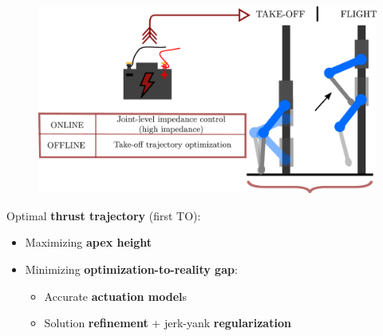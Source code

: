 \documentclass[aspectratio=169]{beamer}
\begin{document}

%


\begin{frame}
\frametitle{\Large}
\begin{multicols}{2}
\vfill\null
\begin{figure}
    \centering
    \includegraphics[width=1.0\columnwidth]{beamer_imgs/impact_opt_intro/first_TO.pdf}
\end{figure}
\columnbreak
Optimal \textbf{thrust trajectory} (first TO):
\begin{itemize}
\item {Maximizing \textbf{apex height}}\vspace{0.2cm}
\item {Minimizing \textbf{optimization-to-reality gap}:}
\begin{itemize}\vspace{0.2cm}
\item {Accurate \textbf{actuation model}s}
\item {Solution \textbf{refinement} + jerk-yank \textbf{regularization}}
\end{itemize}
\end{itemize}
\vfill\null
\end{multicols}
\end{frame}
\end{document}
